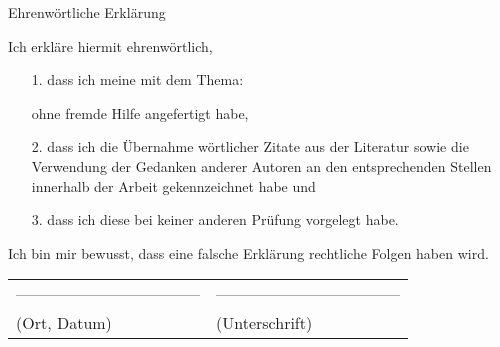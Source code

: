 \thispagestyle{empty}

\begin{center}
	\large Ehrenwörtliche Erklärung
\end{center}

\vspace{0.5cm}

\glqq Ich erkläre hiermit ehrenwörtlich\grqq{},

\vspace{1cm}

\begin{enumerate}
	\item[1.]  
	dass ich meine \dcsubject{} mit dem Thema:
	
	\glqq \dctitle \grqq{}
	
	ohne fremde Hilfe angefertigt habe,
	
	\item[2.] dass ich die Übernahme wörtlicher Zitate aus der Literatur sowie die Verwendung der Gedanken anderer Autoren an den entsprechenden Stellen innerhalb der Arbeit gekennzeichnet habe und
	
	\item[3.] dass ich diese \dcsubject{} bei keiner anderen Prüfung vorgelegt habe.	
\end{enumerate}

\vspace{1cm}

Ich bin mir bewusst, dass eine falsche Erklärung rechtliche Folgen haben wird.

\vspace{2cm}

\begin{tabular}{p{8cm}l}
	----------------------------------- &  ----------------------------------- \\
	(Ort, Datum) 					    &  (Unterschrift)  \\
\end{tabular}
